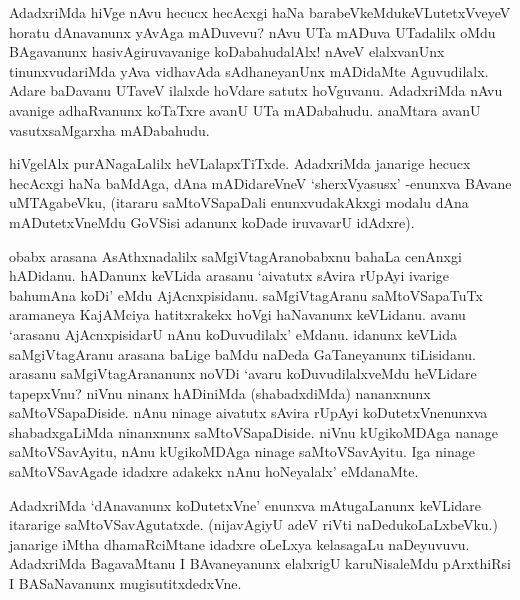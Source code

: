 AdadxriMda hiVge nAvu hecucx hecAcxgi haNa barabeVkeMdukeVLutetxVveyeV horatu dAnavanunx yAvAga mADuvevu? nAvu UTa mADuva UTadalilx oMdu BAgavanunx hasivAgiruvavanige koDabahudalAlx! nAveV elalxvanUnx tinunxvudariMda yAva vidhavAda sAdhaneyanUnx mADidaMte Aguvudilalx. Adare baDavanu UTaveV ilalxde hoVdare satutx hoVguvanu. AdadxriMda nAvu avanige adhaRvanunx koTaTxre avanU UTa mADabahudu. anaMtara avanU vasutxsaMgarxha mADabahudu.

hiVgelAlx purANagaLalilx heVLalapxTiTxde. AdadxriMda janarige hecucx hecAcxgi haNa baMdAga, dAna mADidareVneV `sherxVyasusx' -enunxva BAvane uMTAgabeVku, (itararu saMtoVSapaDali enunxvudakAkxgi modalu dAna mADutetxVneMdu GoVSisi adanunx koDade iruvavarU idAdxre).

obabx arasana AsAthxnadalilx saMgiVtagAranobabxnu bahaLa cenAnxgi hADidanu. hADanunx keVLida arasanu `aivatutx sAvira rUpAyi ivarige bahumAna koDi' eMdu AjAcnxpisidanu. saMgiVtagAranu saMtoVSapaTuTx aramaneya KajAMciya hatitxrakekx hoVgi haNavanunx keVLidanu. avanu `arasanu AjAcnxpisidarU nAnu koDuvudilalx' eMdanu. idanunx keVLida saMgiVtagAranu arasana baLige baMdu naDeda GaTaneyanunx tiLisidanu. arasanu saMgiVtagArananunx noVDi `avaru koDuvudilalxveMdu heVLidare tapepxVnu? niVnu ninanx hADiniMda (shabadxdiMda) nananxnunx saMtoVSapaDiside. nAnu ninage aivatutx sAvira rUpAyi koDutetxVnenunxva shabadxgaLiMda ninanxnunx saMtoVSapaDiside. niVnu kUgikoMDAga nanage saMtoVSavAyitu, nAnu kUgikoMDAga ninage saMtoVSavAyitu. Iga ninage saMtoVSavAgade idadxre adakekx nAnu hoNeyalalx' eMdanaMte.

AdadxriMda `dAnavanunx koDutetxVne' enunxva mAtugaLanunx keVLidare itararige saMtoVSavAgutatxde. (nijavAgiyU adeV riVti naDedukoLaLxbeVku.) janarige iMtha dhamaRciMtane idadxre oLeLxya kelasagaLu naDeyuvuvu. AdadxriMda BagavaMtanu I BAvaneyanunx elalxrigU karuNisaleMdu pArxthiRsi I BASaNavanunx mugisutitxdedxVne.


\endchapter
